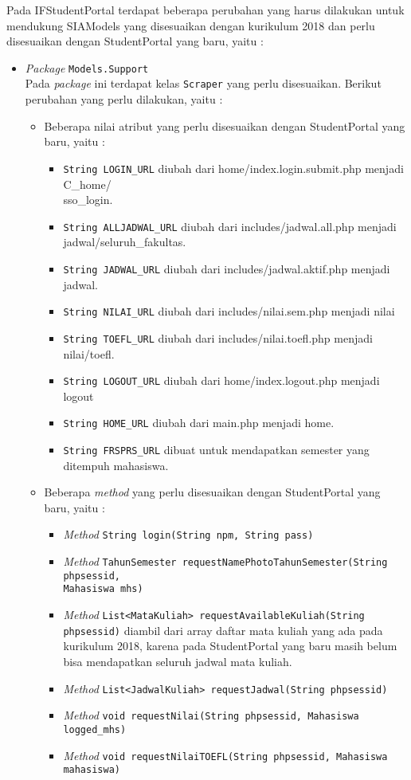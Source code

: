 Pada IFStudentPortal terdapat beberapa perubahan yang harus dilakukan untuk mendukung SIAModels yang disesuaikan dengan kurikulum 2018 dan perlu disesuaikan dengan StudentPortal yang baru, yaitu :
\begin{itemize}
	\item \textit{Package} \texttt{Models.Support} \\
	Pada \textit{package} ini terdapat kelas \texttt{Scraper} yang perlu disesuaikan. Berikut perubahan yang perlu dilakukan, yaitu :
	\begin{itemize}
		\item Beberapa nilai atribut yang perlu disesuaikan dengan StudentPortal yang baru, yaitu :
		\begin{itemize}
			\item \texttt{String LOGIN\_URL} diubah dari home/index.login.submit.php menjadi C\_home/\\sso\_login.
			\item \texttt{String ALLJADWAL\_URL} diubah dari includes/jadwal.all.php menjadi jadwal/seluruh\_fakultas.
			\item \texttt{String JADWAL\_URL} diubah dari includes/jadwal.aktif.php menjadi jadwal.
			\item \texttt{String NILAI\_URL} diubah dari includes/nilai.sem.php menjadi nilai
			\item \texttt{String TOEFL\_URL} diubah dari includes/nilai.toefl.php menjadi nilai/toefl.
			\item \texttt{String LOGOUT\_URL} diubah dari home/index.logout.php menjadi logout
			\item \texttt{String HOME\_URL} diubah dari main.php menjadi home.
			\item \texttt{String FRSPRS\_URL} dibuat untuk mendapatkan semester yang ditempuh mahasiswa.
		\end{itemize}
		\item Beberapa \textit{method} yang perlu disesuaikan dengan StudentPortal yang baru, yaitu :
		\begin{itemize}
			\item \textit{Method} \texttt{String login(String npm, String pass)}
			\item \textit{Method} \texttt{TahunSemester requestNamePhotoTahunSemester(String phpsessid, \\Mahasiswa mhs)}
			\item \textit{Method} \texttt{List<MataKuliah> requestAvailableKuliah(String phpsessid)} diambil dari array daftar mata kuliah yang ada pada kurikulum 2018, karena pada StudentPortal yang baru masih belum bisa mendapatkan seluruh jadwal mata kuliah. 
			\item \textit{Method} \texttt{List<JadwalKuliah> requestJadwal(String phpsessid)}
			\item \textit{Method} \texttt{void requestNilai(String phpsessid, Mahasiswa logged\_mhs)}
			\item \textit{Method} \texttt{void requestNilaiTOEFL(String phpsessid, Mahasiswa mahasiswa)}
		\end{itemize}
	\end{itemize}
\end{itemize}

